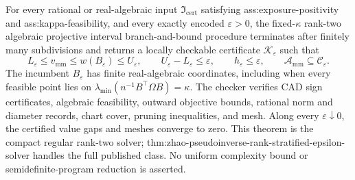 For every rational or real-algebraic input \(\mathfrak I_{\mathrm{cert}}\) satisfying ass:exposure-positivity and ass:kappa-feasibility, and every exactly encoded \(\varepsilon>0\), the fixed-\(\kappa\) rank-two algebraic projective interval branch-and-bound procedure terminates after finitely many subdivisions and returns a locally checkable certificate \(\mathscr K_{\varepsilon}\) such that
\[
 L_{\varepsilon}\le v_{\mathrm{mm}}\le w(B_{\varepsilon})\le U_{\varepsilon},
 \qquad U_{\varepsilon}-L_{\varepsilon}\le\varepsilon,
 \qquad h_{\varepsilon}\le\varepsilon,
 \qquad \mathcal A_{\mathrm{mm}}\subseteq\mathcal C_{\varepsilon}.
\]
The incumbent \(B_{\varepsilon}\) has finite real-algebraic coordinates, including when every feasible point lies on \(\lambda_{\min}(n^{-1}B^{\top}\Omega B)=\kappa\).  The checker verifies CAD sign certificates, algebraic feasibility, outward objective bounds, rational norm and diameter records, chart cover, pruning inequalities, and mesh.  Along every \(\varepsilon\downarrow0\), the certified value gaps and meshes converge to zero.  This theorem is the compact regular rank-two solver; thm:zhao-pseudoinverse-rank-stratified-epsilon-solver handles the full published class.  No uniform complexity bound or semidefinite-program reduction is asserted.